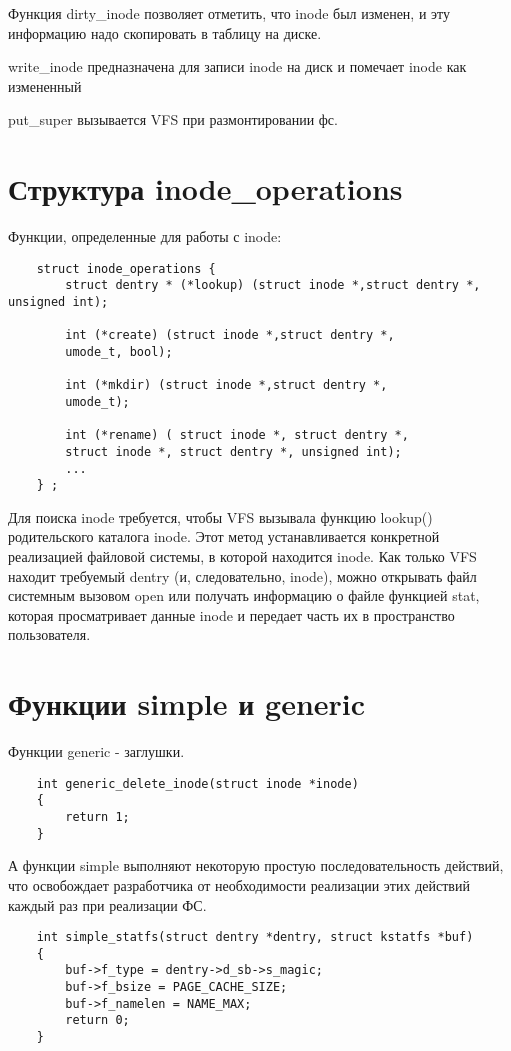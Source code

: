 Функция dirty\_inode позволяет отметить, что inode был изменен, и эту информацию надо скопировать в таблицу на диске.

write\_inode предназначена для записи inode на диск и помечает inode как измененный

put\_super вызывается VFS при размонтировании фс.


\section{Структура inode\_operations}
Функции, определенные для работы с inode:
\begin{lstlisting}
	struct inode_operations {
		struct dentry * (*lookup) (struct inode *,struct dentry *, unsigned int);
		
		int (*create) (struct inode *,struct dentry *,
		umode_t, bool);
		
		int (*mkdir) (struct inode *,struct dentry *,
		umode_t);
		
		int (*rename) ( struct inode *, struct dentry *,
		struct inode *, struct dentry *, unsigned int);
		...
	} ;
\end{lstlisting}

Для поиска inode требуется, чтобы VFS вызывала функцию lookup() родительского каталога inode. Этот метод устанавливается конкретной реализацией файловой системы, в которой находится inode. Как только VFS находит требуемый dentry (и, следовательно, inode), можно открывать файл системным вызовом open или получать информацию о файле функцией stat, которая просматривает данные inode и передает часть их в пространство пользователя.


\section{Функции simple и generic}
Функции generic - заглушки.
\begin{lstlisting}
	int generic_delete_inode(struct inode *inode)
	{
		return 1;
	}
\end{lstlisting}

А функции simple выполняют некоторую простую последовательность действий, что освобождает разработчика от необходимости реализации этих действий каждый раз при реализации ФС. 
\begin{lstlisting}
	int simple_statfs(struct dentry *dentry, struct kstatfs *buf)
	{
		buf->f_type = dentry->d_sb->s_magic;
		buf->f_bsize = PAGE_CACHE_SIZE;
		buf->f_namelen = NAME_MAX;
		return 0;
	}
\end{lstlisting}


